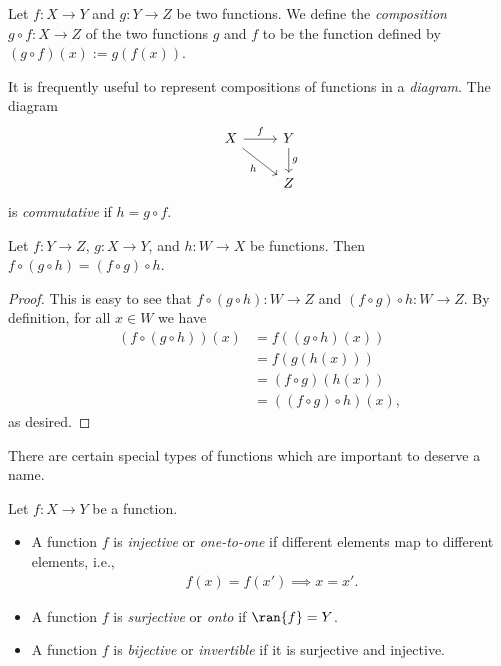 \begin{definition}[Compositions]
    Let $f : X \to Y$ and $g : Y \to Z$ be two functions. We define the \emph{composition} $g \circ f : X \to Z$ of the two functions $g$ and $f$ to be the function defined by $(g \circ f)(x) := g(f(x))$.
\end{definition}

\begin{remark}
    It is frequently useful to represent compositions of functions in a \emph{diagram}. The diagram
    \[
    \begin{tikzcd}
        X \arrow[r, "f"] \arrow[dr, swap, "h"] & Y \arrow[d, "g"]\\
        & Z
    \end{tikzcd}
    \]
    is \emph{commutative} if $h = g \circ f$.
\end{remark}

\begin{lemma}
    Let $f : Y \to Z$, $g : X \to Y$, and $h : W \to X$ be functions. Then $f \circ (g \circ h) = (f \circ g) \circ h$.
\end{lemma}

\begin{proof}
    This is easy to see that $f \circ (g \circ h) : W \to Z$ and $(f \circ g) \circ h : W \to Z$. By definition, for all $x \in W$ we have
    \begin{align*}
        (f \circ (g \circ h))(x)
        &= f((g\circ h)(x))\\
        &= f(g(h(x)))\\
        &= (f \circ g)(h(x))\\
        &= ((f \circ g) \circ h)(x),
    \end{align*}
    as desired.
\end{proof}


There are certain special types of functions which are important to deserve a name.

\begin{definition}
    Let $f : X \to Y$ be a function.
    \begin{itemize}
        \item A function $f$ is \emph{injective} or \emph{one-to-one} if different elements map to different elements, i.e.,
            \begin{align*}
                f(x) = f(x') \implies x = x'.
            \end{align*}
        \item A function $f$ is \emph{surjective} or \emph{onto} if $\ran{f} = Y$.
        \item A function $f$ is \emph{bijective} or \emph{invertible} if it is surjective and injective.
    \end{itemize}
\end{definition}

